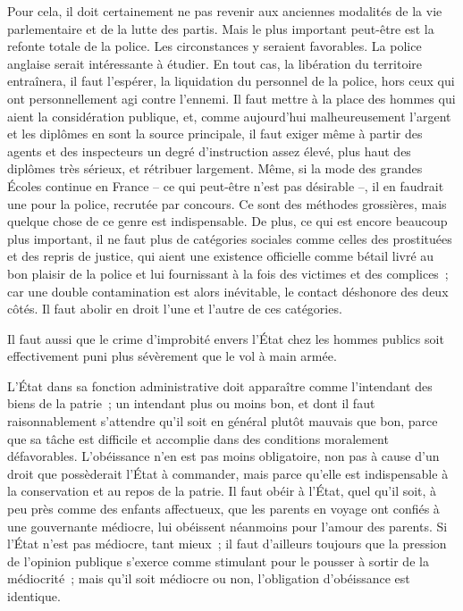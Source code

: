 \documentclass[french,twoside]{book} %
\begin{document}
Pour cela, il doit certainement ne pas revenir aux anciennes modalités de la vie parlementaire et de la lutte des partis. Mais le plus important peut-être est la refonte totale de la police. Les circonstances y seraient favorables. La police anglaise serait intéressante à étudier. En tout cas, la libération du territoire entraînera, il faut l'espérer, la liquidation du personnel de la police, hors ceux qui ont personnellement agi contre l'ennemi. Il faut mettre à la place des hommes qui aient la considération publique, et, comme aujourd'hui malheureusement l'argent et les diplômes en sont la source principale, il faut exiger même à partir des agents et des inspecteurs un degré d'instruction assez élevé, plus haut des diplômes très sérieux, et rétribuer largement. Même, si la mode des grandes Écoles continue en France – ce qui peut-être n'est pas désirable –, il en faudrait une pour la police, recrutée par concours. Ce sont des méthodes grossières, mais quelque chose de ce genre est indispensable. De plus, ce qui est encore beaucoup plus important, il ne faut plus de catégories sociales comme celles des prostituées et des repris de justice, qui aient une existence officielle comme bétail livré au bon plaisir de la police et lui fournissant à la fois des victimes et des complices ; car une double contamination est alors inévitable, le contact déshonore des deux côtés. Il faut abolir en droit l'une et l'autre de ces catégories.\par
Il faut aussi que le crime d'improbité envers l'État chez les hommes publics soit effectivement puni plus sévèrement que le vol à main armée.\par
L’État dans sa fonction administrative doit apparaître comme l'intendant des biens de la patrie ; un intendant plus ou moins bon, et dont il faut raisonnablement s'attendre qu'il soit en général plutôt mauvais que bon, parce que sa tâche est difficile et accomplie dans des conditions moralement défavorables. L'obéissance n'en est pas moins obligatoire, non pas à cause d'un droit que possèderait l'État à commander, mais parce qu'elle est indispensable à la conservation et au repos de la patrie. Il faut obéir à l'État, quel qu'il soit, à peu près comme des enfants affectueux, que les parents en voyage ont confiés à une gouvernante médiocre, lui obéissent néanmoins pour l'amour des parents. Si l'État n'est pas médiocre, tant mieux ; il faut d'ailleurs toujours que la pression de l'opinion publique s'exerce comme stimulant pour le pousser à sortir de la médiocrité ; mais qu'il soit médiocre ou non, l'obligation d'obéissance est identique.\par
\end{document}
